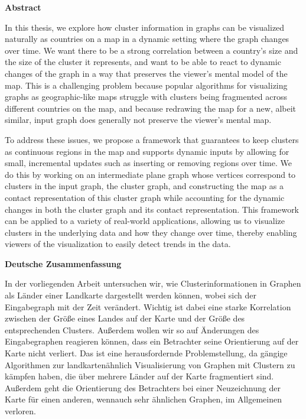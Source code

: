 \begin{addmargin}{0.5cm}

\centerline{\textbf{Abstract}}

In this thesis, we explore how cluster information in graphs can be visualized naturally as countries on a map in a dynamic setting where the graph changes over time.
We want there to be a strong correlation between a country's size and the size of the cluster it represents, and want to be able to react to dynamic changes of the graph in a way that preserves the viewer's mental model of the map.
This is a challenging problem because popular algorithms for visualizing graphs as geographic-like maps struggle with clusters being fragmented across different countries on the map, and because redrawing the map for a new, albeit similar, input graph does generally not preserve the viewer's mental map.

To address these issues, we propose a framework that guarantees to keep clusters as continuous regions in the map and supports dynamic inputs by allowing for small, incremental updates such as inserting or removing regions over time.
We do this by working on an intermediate plane graph whose vertices correspond to clusters in the input graph, the cluster graph, and constructing the map as a contact representation of this cluster graph while accounting for the dynamic changes in both the cluster graph and its contact representation.
This framework can be applied to a variety of real-world applications, allowing us to visualize clusters in the underlying data and how they change over time, thereby enabling viewers of the visualization to easily detect trends in the data.

\vskip 2cm

\centerline{\textbf{Deutsche Zusammenfassung}}

In der vorliegenden Arbeit untersuchen wir, wie Clusterinformationen in Graphen als Länder einer Landkarte dargestellt werden können, wobei sich der Eingabegraph mit der Zeit verändert.
Wichtig ist dabei eine starke Korrelation zwischen der Größe eines Landes auf der Karte und der Größe des entsprechenden Clusters.
Außerdem wollen wir so auf Änderungen des Eingabegraphen reagieren können, dass ein Betrachter seine Orientierung auf der Karte nicht verliert.
Das ist eine herausfordernde Problemstellung, da gängige Algorithmen zur landkartenähnlich Visualisierung von Graphen mit Clustern zu kämpfen haben, die über mehrere Länder auf der Karte fragmentiert sind.
Außerdem geht die Orientierung des Betrachters bei einer Neuzeichnung der Karte für einen anderen, wennauch sehr ähnlichen Graphen, im Allgemeinen verloren.


\end{addmargin}
